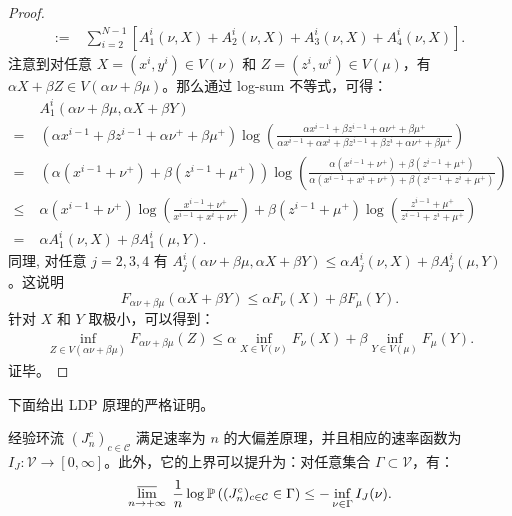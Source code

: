 \begin{proof}
\begin{align*}
		:=&\;\sum_{i=2}^{N-1}[A_1^i(\nu,X)+A_2^i(\nu,X)+A_3^i(\nu,X)+A_4^i(\nu,X)].
	\end{align*}
	注意到对任意 $X=(x^i,y^i)\in V(\nu)$ 和 $Z=(z^i,w^i)\in V(\mu)$，有 $\alpha X+\beta Z\in V(\alpha\nu+\beta\mu)$。那么通过 log-sum 不等式，可得：
	\begin{align*}
		&\;A_1^i(\alpha\nu+\beta \mu,\alpha X+\beta Y)\\
		=&\;(\alpha x^{i-1}+\beta z^{i-1}+\alpha\nu^++\beta \mu^+ )\log\left(\frac{\alpha x^{i-1}+\beta z^{i-1}+\alpha\nu^++\beta \mu^+}{\alpha x^{i-1}+\alpha x^i+\beta z^{i-1}+\beta z^i+\alpha\nu^++\beta \mu^+}\right)\\
		=&\;(\alpha (x^{i-1}+\nu^+)+\beta (z^{i-1}+ \mu^+) )\log\left(\frac{\alpha (x^{i-1}+\nu^+)+\beta (z^{i-1}+ \mu^+)}{\alpha (x^{i-1}+ x^i+\nu^+)+\beta (z^{i-1}+ z^i+ \mu^+)}\right)\\
		\le &\; \alpha (x^{i-1}+\nu^+)\log\left(\frac{x^{i-1}+\nu^+}{x^{i-1}+ x^i+\nu^+}\right)+\beta (z^{i-1}+ \mu^+)\log\left(\frac{z^{i-1}+ \mu^+}{z^{i-1}+ z^i+ \mu^+}\right)\\
		=&\;\alpha A^i_1(\nu,X)+\beta A^i_1(\mu,Y).
	\end{align*}
	同理, 对任意 $j=2,3,4$ 有 $A^i_j(\alpha \nu+\beta \mu,\alpha X+\beta Y)\le \alpha A^i_j(\nu,X)+\beta A^i_j (\mu,Y)$。这说明
	\begin{equation*}
		F_{\alpha \nu+\beta \mu}(\alpha X+\beta Y)\le \alpha F_{\nu}(X)+\beta F_{\mu}(Y).
	\end{equation*}
	针对 $X$ 和 $Y$ 取极小，可以得到：
	\begin{align*}
		\inf_{Z\in V(\alpha\nu+\beta\mu)}F_{\alpha\nu+\beta\mu}( Z)\le\alpha \inf_{X\in V(\nu)} F_{\nu}(X)+\beta \inf_{Y\in V(\mu)} F_{\mu}(Y).
	\end{align*}
	证毕。
\end{proof}
下面给出 LDP 原理的严格证明。
\begin{proposition}\label{theorem:LDP}
	经验环流 $(J^c_n)_{c\in\mathcal{C}}$ 满足速率为 $n$ 的大偏差原理，并且相应的速率函数为 $I_J:\mathcal{V}\to [0,\infty]$。此外，它的上界可以提升为：对任意集合 $\Gamma \subset \mathcal{V}$，有：
	\begin{align}\label{upper bound}
		\varlimsup_{n\to+\infty}\;
		\frac 1n \log \mathbb  P \left( (J^c_n)_{c\in \mathcal{C}} \in \Gamma \right)
		\le -\inf_{\nu\in \Gamma} I_J(\nu).
	\end{align}
\end{proposition}
